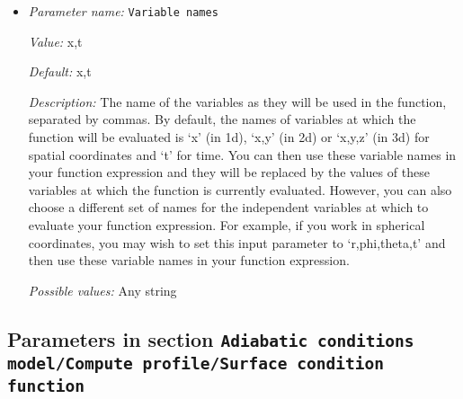 \begin{itemize}
{\it Possible values:} A boolean value (true or false)
\item {\it Parameter name:} {\tt Variable names}
\label{parameters:Adiabatic conditions model/Compute profile/Variable names}


{\it Value:} x,t


{\it Default:} x,t


{\it Description:} The name of the variables as they will be used in the function, separated by commas. By default, the names of variables at which the function will be evaluated is `x' (in 1d), `x,y' (in 2d) or `x,y,z' (in 3d) for spatial coordinates and `t' for time. You can then use these variable names in your function expression and they will be replaced by the values of these variables at which the function is currently evaluated. However, you can also choose a different set of names for the independent variables at which to evaluate your function expression. For example, if you work in spherical coordinates, you may wish to set this input parameter to `r,phi,theta,t' and then use these variable names in your function expression.


{\it Possible values:} Any string
\end{itemize}



\subsection{Parameters in section \tt Adiabatic conditions model/Compute profile/Surface condition function}
\label{parameters:Adiabatic_20conditions_20model/Compute_20profile/Surface_20condition_20function}

